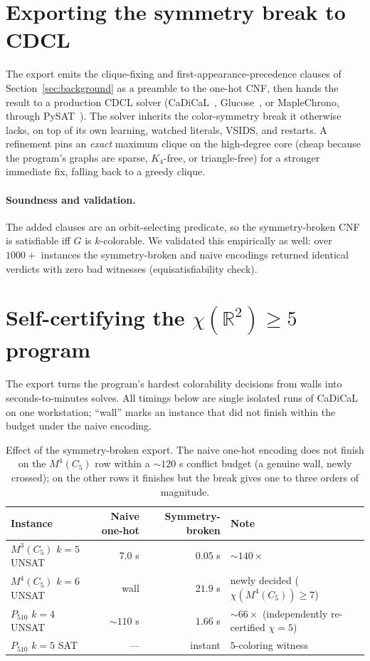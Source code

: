 \documentclass[11pt]{article}
\theoremstyle{definition}
\newcommand{\R}{\mathbb{R}}
\newcommand{\chrom}{\chi}
\begin{document}
\section{Exporting the symmetry break to CDCL}
\label{sec:export}

The export emits the clique-fixing and first-appearance-precedence clauses of
Section~\ref{sec:background} as a preamble to the one-hot CNF, then hands the
result to a production CDCL solver (CaDiCaL~\cite{BiereCadical},
Glucose~\cite{AudemardSimon2009}, or MapleChrono, through
PySAT~\cite{IgnatievPySAT}). The solver inherits the color-symmetry break it
otherwise lacks, on top of its own learning, watched literals, VSIDS, and
restarts. A refinement pins an \emph{exact} maximum clique on the high-degree
core (cheap because the program's graphs are sparse, $K_4$-free, or
triangle-free) for a stronger immediate fix, falling back to a greedy clique.

\paragraph{Soundness and validation.} The added clauses are an orbit-selecting
predicate, so the symmetry-broken CNF is satisfiable iff $G$ is $k$-colorable. We
validated this empirically as well: over $1000+$ instances the symmetry-broken and
naive encodings returned identical verdicts with zero bad witnesses
(equisatisfiability check).

\section{Self-certifying the $\chrom(\R^2) \ge 5$ program}
\label{sec:results}

The export turns the program's hardest colorability decisions from walls into
seconds-to-minutes solves. All timings below are single isolated runs of
CaDiCaL~\cite{BiereCadical} on one workstation; ``wall'' marks an instance that
did not finish within the budget under the naive encoding.

\begin{table}[ht]
\centering
\caption{Effect of the symmetry-broken export. The naive one-hot encoding does not
finish on the $M^4(C_5)$ row within a $\sim\!120$ s conflict budget (a genuine
wall, newly crossed); on the other rows it finishes but the break gives one to
three orders of magnitude.}
\label{tab:walls}
\begin{tabular}{l r r l}
\toprule
Instance & Naive one-hot & Symmetry-broken & Note \\
\midrule
$M^3(C_5)$ $k{=}5$ UNSAT & $7.0$ s & $\mathbf{0.05}$ s & $\sim\!140\times$ \\
$M^4(C_5)$ $k{=}6$ UNSAT & wall & $\mathbf{21.9}$ s & newly decided
  ($\chrom(M^4(C_5)) \ge 7$) \\
$P_{510}$ $k{=}4$ UNSAT & $\sim\!110$ s & $\mathbf{1.66}$ s & $\sim\!66\times$
  (independently re-certified $\chrom = 5$) \\
$P_{510}$ $k{=}5$ SAT & --- & instant & $5$-coloring witness \\
\bottomrule
\end{tabular}
\end{table}
\end{document}

